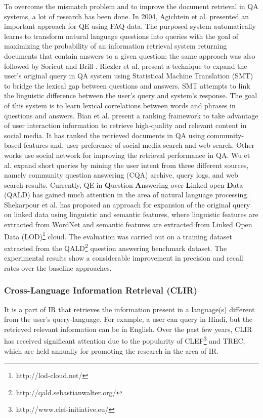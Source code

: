 To overcome the mismatch problem and to improve the document retrieval in QA systems, a lot of research has been done. In 2004, Agichtein et al. \cite{agichtein2004learning} presented an important approach for QE using FAQ data. The purposed system automatically learns to transform natural language questions into queries with the goal of maximizing the probability of an information retrieval system returning documents that contain answers to a given question; the same approach was also followed by Soricut and Brill \cite{soricut2006automatic}. Riezler et al. \cite{riezler2007statistical} present a technique to expand the user's original query in QA system using Statistical Machine Translation (SMT) to bridge the lexical gap between questions and answers. SMT attempts to link the linguistic difference between the user's query and system's response. The goal of this system is to learn lexical correlations between words and phrases in questions and answers. Bian et al. \cite{bian2008finding} present a ranking framework to take advantage of user interaction information to retrieve high-quality and relevant content in social media. It has ranked the retrieved documents in QA using  community-based features and, user preference of social media search and web search. Other works \cite{panovich2012tie,liu2015complementary,cavalin2016building,molino2016social} use social network for improving the retrieval performance in QA. Wu et al. \cite{Wu:2014:ISR:2556195.2556239} expand short queries by mining the user intent from three different sources, namely community question answering (CQA) archive, query logs, and web search results. Currently, QE in \textbf{Q}uestion \textbf{A}nswering over \textbf{L}inked open \textbf{D}ata (QALD) has gained much attention in the area of natural language processing. Shekarpour et al. \cite{shekarpour2013keyword} has proposed an approach for expansion of the original query on linked data using linguistic and semantic features, where linguistic features are extracted from WordNet and semantic features are extracted from Linked Open Data (LOD)\footnote{http://lod-cloud.net/} cloud. The evaluation was carried out on a training dataset extracted from the QALD\footnote{http://qald.sebastianwalter.org/} question answering benchmark dataset. The experimental results show a considerable improvement in precision and recall rates over the baseline approaches. 

\subsubsection{Cross-Language Information Retrieval (CLIR)}
It is a part of IR that retrieves the information present in a language(s) different from the user's query-language. For example, a user can query in Hindi, but the retrieved relevant information can be in English. Over the past few years, CLIR has received significant attention due to the popularity of CLEF\footnote{http://www.clef-initiative.eu/} and TREC, which are held annually for promoting the research in the area of IR.

